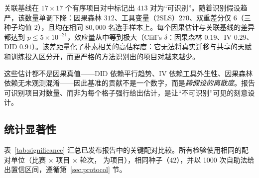 关联基线在 $17 \times 17$ 个有序项目对中标记出 $413$ 对为“可识别”。随着识别假设趋严，该数量单调下降：因果森林 $312$、工具变量（2SLS）$270$、双重差分仅 $6$（三种子均值 $2$），且均在相同 $80{,}000$ 名选手样本上。每个因果估计与关联基线的差异都达到 $p\le5\times10^{-21}$，效应量从中等到极大（Cliff's $\delta$：因果森林 $0.19$、IV $0.29$、DID $0.91$）。该差距量化了朴素相关的高估程度：它无法将真实迁移与共享的天赋和训练投入区分开，而更严格的方法识别出的项目对越来越少。

这些估计都不是因果真值——DID 依赖平行趋势、IV 依赖工具外生性、因果森林依赖无未观测混淆——因此基准的贡献不是一个数字，而是\emph{跨假设的离散度}。报告可识别项目对数量、而非为每个格子强行给出估计，是让“不可识别”可见的刻意设计。

\subsection{统计显著性}
\label{sec:results-significance}

表~\ref{tab:significance} 汇总已发布报告中的关键配对比较。所有检验使用相同的配对单位（比赛 $\times$ 项目 $\times$ 轮次， 为项目），相同种子（42），并以 1000 次自助法给出置信区间，遵循第~\ref{sec:protocol} 节。

